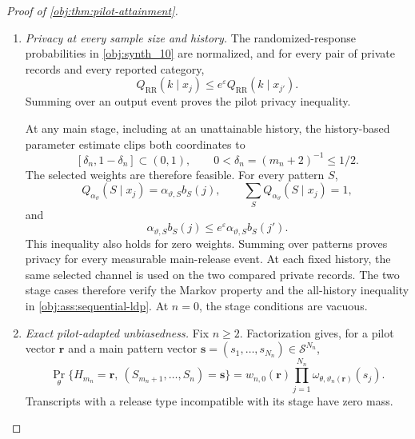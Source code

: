 \begin{proof}[Proof of \cref{obj:thm:pilot-attainment}]
\begin{enumerate}
For every \(x\in\mathbb R\) and \(\delta>0\),
\[
\begin{aligned}
\Pr_\theta\{\mathsf T_n\le x-\delta\}
-\Pr_\theta\{|\mathsf W_n-\mathsf T_n|\ge\delta\}
&\le\Pr_\theta\{\mathsf W_n\le x\}\\
&\le\Pr_\theta\{\mathsf T_n\le x+\delta\}
+\Pr_\theta\{|\mathsf W_n-\mathsf T_n|\ge\delta\}.
\end{aligned}
\]
Taking limits and then letting \(\delta\downarrow0\) proves convergence of the pivot distribution functions to \(\Phi\). The closed interval
\([-z_{1-\gamma/2},z_{1-\gamma/2}]\) has zero normal boundary mass, so
\[
\Pr_\theta\{|\mathsf W_n|\le z_{1-\gamma/2}\}
\longrightarrow
N(0,1)([-z_{1-\gamma/2},z_{1-\gamma/2}]).
\]
The event equivalence transfers this limit to the stated Wald event.

\item \emph{Privacy at every sample size and history.}
The randomized-response probabilities in \cref{obj:synth_10} are normalized, and for every pair of private records and every reported category,
\[
Q_{\mathrm{RR}}(k\mid x_j)
\le e^\varepsilon Q_{\mathrm{RR}}(k\mid x_{j'}).
\]
Summing over an output event proves the pilot privacy inequality.

At any main stage, including at an unattainable history, the history-based parameter estimate clips both coordinates to
\[
[\delta_n,1-\delta_n]\subset(0,1),
\qquad
0<\delta_n=(m_n+2)^{-1}\le1/2.
\]
The selected weights are therefore feasible. For every pattern \(S\),
\[
Q_{\alpha_\vartheta}(S\mid x_j)
=\alpha_{\vartheta,S}b_S(j),
\qquad
\sum_SQ_{\alpha_\vartheta}(S\mid x_j)=1,
\]
and
\[
\alpha_{\vartheta,S}b_S(j)
\le e^\varepsilon\alpha_{\vartheta,S}b_S(j').
\]
This inequality also holds for zero weights. Summing over patterns proves privacy for every measurable main-release event. At each fixed history, the same selected channel is used on the two compared private records. The two stage cases therefore verify the Markov property and the all-history inequality in \cref{obj:ass:sequential-ldp}. At \(n=0\), the stage conditions are vacuous.

\item \emph{Exact pilot-adapted unbiasedness.}
Fix \(n\ge2\). Factorization gives, for a pilot vector \(\mathbf r\) and a main pattern vector
\(\mathbf s=(s_1,\ldots,s_{N_n})\in\mathcal S^{N_n}\),
\[
\Pr_\theta\{H_{m_n}=\mathbf r,\ (S_{m_n+1},\ldots,S_n)=\mathbf s\}
=
w_{n,0}(\mathbf r)
\prod_{j=1}^{N_n}
\omega_{\theta,\vartheta_n(\mathbf r)}(s_j).
\]
Transcripts with a release type incompatible with its stage have zero mass.


\end{enumerate}
\end{proof}
